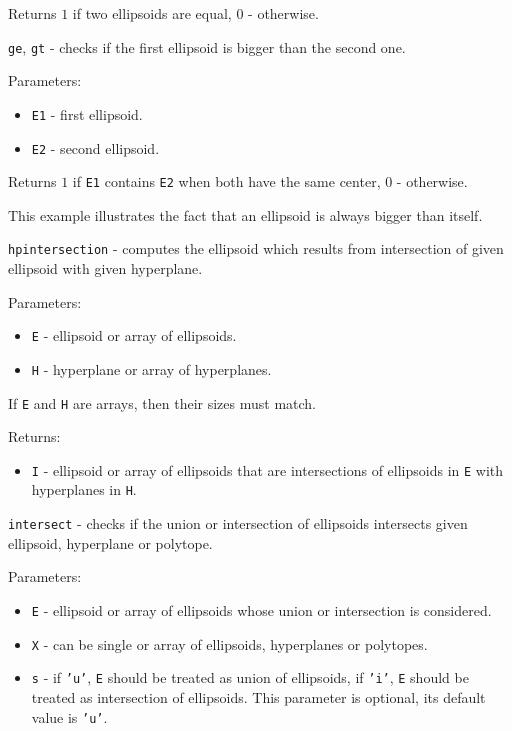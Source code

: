 \documentclass{report}
\begin{document}
Returns $1$ if two ellipsoids are equal, $0$ - otherwise.



\newpage

{\Large {\tt ge}}, {\Large {\tt gt}} - checks if the first ellipsoid is bigger
than the second one.

Parameters:
\begin{itemize}
\item {\tt E1} - first ellipsoid.
\item {\tt E2} - second ellipsoid.
\end{itemize}

Returns $1$ if {\tt E1} contains {\tt E2} when both have the same center,
$0$ - otherwise.


This example illustrates the fact that an ellipsoid is always bigger than itself.

\newpage

{\Large {\tt hpintersection}} - computes the ellipsoid which results from
intersection of given ellipsoid with given hyperplane.

Parameters:
\begin{itemize}
\item {\tt E} - ellipsoid or array of ellipsoids.
\item {\tt H} - hyperplane or array of hyperplanes.
\end{itemize}
If {\tt E} and {\tt H} are arrays, then their sizes must match.

Returns:
\begin{itemize}
\item {\tt I} - ellipsoid or array of ellipsoids that are intersections of
ellipsoids in {\tt E} with hyperplanes in {\tt H}.
\end{itemize}



\newpage

{\Large {\tt intersect}} - checks if the union or intersection of ellipsoids
intersects given ellipsoid, hyperplane or polytope.

Parameters:
\begin{itemize}
\item {\tt E} - ellipsoid or array of ellipsoids whose union or intersection
is considered.
\item {\tt X} - can be single or array of ellipsoids, hyperplanes or polytopes.
\item {\tt s} - if {\tt 'u'}, {\tt E} should be treated as union of ellipsoids,
if {\tt 'i'}, {\tt E} should be treated as intersection of ellipsoids.
This parameter is optional, its default value is {\tt 'u'}.
\end{itemize}
\end{document}
